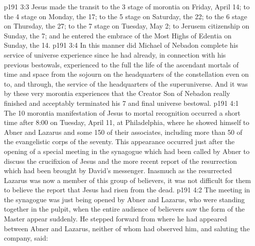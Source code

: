 \vs p191 3:3 Jesus made the transit to the 3 stage of morontia on Friday, April 14; to the 4 stage on Monday, the 17; to the 5 stage on Saturday, the 22; to the 6 stage on Thursday, the 27; to the 7 stage on Tuesday, May 2; to Jerusem citizenship on Sunday, the 7; and he entered the embrace of the Most Highs of Edentia on Sunday, the 14.
\vs p191 3:4 In this manner did Michael of Nebadon complete his service of universe experience since he had already, in connection with his previous bestowals, experienced to the full the life of the ascendant mortals of time and space from the sojourn on the headquarters of the constellation even on to, and through, the service of the headquarters of the superuniverse. And it was by these very morontia experiences that the Creator Son of Nebadon really finished and acceptably terminated his 7 and final universe bestowal.
\vs p191 4:1 The 10 morontia manifestation of Jesus to mortal recognition occurred a short time after 8:00 on Tuesday, April 11, at Philadelphia, where he showed himself to Abner and Lazarus and some 150 of their associates, including more than 50 of the evangelistic corps of the seventy. This appearance occurred just after the opening of a special meeting in the synagogue which had been called by Abner to discuss the crucifixion of Jesus and the more recent report of the resurrection which had been brought by David’s messenger. Inasmuch as the resurrected Lazarus was now a member of this group of believers, it was not difficult for them to believe the report that Jesus had risen from the dead.
\vs p191 4:2 The meeting in the synagogue was just being opened by Abner and Lazarus, who were standing together in the pulpit, when the entire audience of believers saw the form of the Master appear suddenly. He stepped forward from where he had appeared between Abner and Lazarus, neither of whom had observed him, and saluting the company, said:
